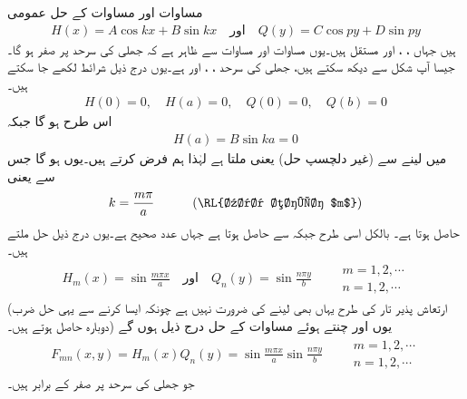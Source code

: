\quad مساوات  اور مساوات  کے حل عمومی
\begin{align*}
H(x)=A\cos kx+B\sin kx \quad \text{اور}\quad Q(y)=C\cos py+D\sin py
\end{align*}
ہیں جہاں ، ،  اور  مستقل ہیں۔یوں مساوات  اور مساوات  سے ظاہر ہے کہ جھلی کی سرحد پر  صفر ہو گا۔جیسا آپ شکل  سے دیکھ سکتے ہیں، جھلی کی سرحد ، ،  اور  ہے۔یوں درج ذیل شرائط لکھے جا سکتے ہیں۔
\begin{align*}
H(0)=0,\quad H(a)=0,\quad Q(0)=0,\quad Q(b)=0
\end{align*}
اس طرح  ہو گا جبکہ
\begin{align*}
H(a)=B\sin ka=0
\end{align*}
میں  لینے سے (غیر دلچسپ حل)  یعنی  ملتا ہے لہٰذا ہم  فرض کرتے ہیں۔یوں  ہو گا جس سے  یعنی
\begin{align}
k=\frac{m\pi}{a}\quad \quad \quad (\text{\RL{عدد صحیح $m$}})
\end{align}
حاصل ہوتا ہے۔ بالکل اسی طرح  جبکہ  سے  حاصل ہوتا ہے جہاں  عدد صحیح ہے۔یوں درج ذیل حل ملتے ہیں۔
\begin{align*}
H_m(x)=\sin \frac{m\pi x}{a}\quad \text{اور}\quad Q_n(y)=\sin\frac{n\pi y}{b}
\quad \quad  \substack{m=1,2,\cdots\\n=1,2,\cdots}
\end{align*}
(ارتعاش پذیر تار کی طرح یہاں بھی  لینے کی ضرورت نہیں ہے چونکہ ایسا کرنے سے یہی حل ضرب  دوبارہ حاصل ہوتے ہیں۔) یوں   اور  چنتے ہوئے مساوات  کے حل درج ذیل ہوں گے
\begin{align}\label{مساوات_جزوی_مستطیل_مستقل_الف}
F_{mn}(x,y)=H_m(x)Q_n(y)=\sin \frac{m\pi x}{a}\sin\frac{n\pi y}{b} \quad \quad \substack{m=1,2,\cdots\\n=1,2,\cdots}
\end{align}
جو جھلی کی سرحد پر صفر کے برابر ہیں۔

